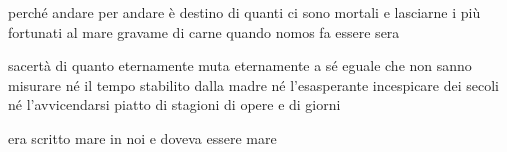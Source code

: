 \begin{poem}
	\begin{stanza}
		perché andare per andare\verseline
		è destino di quanti ci sono mortali\verseline
		e lasciarne i più fortunati\verseline
		al mare gravame di carne\verseline
		quando nomos fa essere sera
	\end{stanza}

	\begin{stanza}
		sacertà di quanto eternamente muta\verseline
		eternamente a sé eguale\verseline
		che non sanno misurare né il tempo\verseline
		stabilito dalla madre\verseline
		né l’esasperante incespicare dei secoli\verseline
		né l’avvicendarsi piatto di stagioni\verseline
		di opere e di giorni
	\end{stanza}

	\begin{stanza}
		era scritto mare in noi\verseline
		e doveva essere\verseline
		mare
	\end{stanza}
\end{poem}
